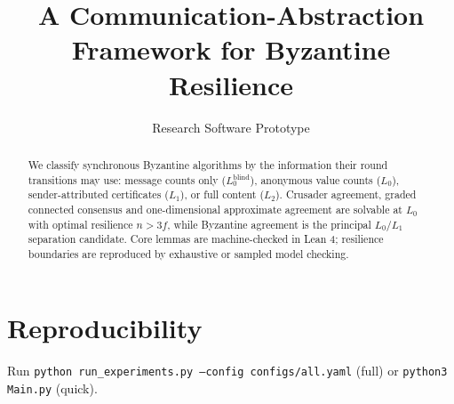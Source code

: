 \documentclass[11pt]{article}
\title{A Communication-Abstraction Framework for Byzantine Resilience}
\author{Research Software Prototype}
\begin{document}
\maketitle
\begin{abstract}
We classify synchronous Byzantine algorithms by the information their round transitions may use: message counts only ($L_0^{\mathrm{blind}}$), anonymous value counts ($L_0$), sender-attributed certificates ($L_1$), or full content ($L_2$). Crusader agreement, graded connected consensus and one-dimensional approximate agreement are solvable at $L_0$ with optimal resilience $n>3f$, while Byzantine agreement is the principal $L_0/L_1$ separation candidate. Core lemmas are machine-checked in Lean 4; resilience boundaries are reproduced by exhaustive or sampled model checking.
\end{abstract}




\section{Reproducibility}
Run \texttt{python run\_experiments.py --config configs/all.yaml} (full) or \texttt{python3 Main.py} (quick).


\end{document}
